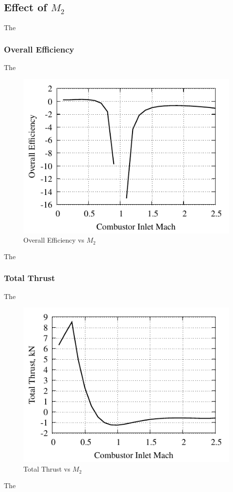 \documentclass[conf]{new-aiaa} %
\begin{document}
\subsection{Effect of \texorpdfstring{\textit{$M_2$}}{M2}} %
The

\subsubsection{Overall Efficiency}
The

\begin{figure}[hbt!] %
    \centering
    \includegraphics[]{media/performance_parameter_files/part_h_eta_o.pdf}
    \caption{\label{fig:parthetao}Overall Efficiency vs \texorpdfstring{\textit{$M_2$}}{M2}}
\end{figure}
The

\subsubsection{Total Thrust}
The

\begin{figure}[hbt!] %
    \centering
    \includegraphics[]{media/performance_parameter_files/part_h_T.pdf}
    \caption{\label{fig:partht}Total Thrust vs \texorpdfstring{\textit{$M_2$}}{M2}}
\end{figure}
The
\end{document}
